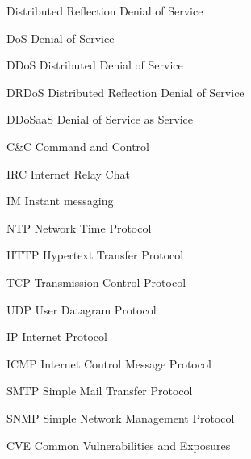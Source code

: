 \begin{seznamzkratek}{Distributed Reflection Denial of Service}

		{DoS}
		{Denial of Service}

		{DDoS}
		{Distributed Denial of Service}

		{DRDoS}
		{Distributed Reflection Denial of Service}

		{DDoSaaS}
		{Denial of Service as Service}

		{C\&C} %
		{Command and Control}

		{IRC}
		{Internet Relay Chat}

		{IM}
		{Instant messaging}

		{NTP}
		{Network Time Protocol}

		{HTTP}
		{Hypertext Transfer Protocol}

		{TCP}
		{Transmission Control Protocol}

		{UDP}
		{User Datagram Protocol}

		{IP}
		{Internet Protocol}

		{ICMP}
		{Internet Control Message Protocol}

		{SMTP}
		{Simple Mail Transfer Protocol}
		
		{SNMP}
		{Simple Network Management Protocol}
	
		{CVE}
		{Common Vulnerabilities and Exposures}
\end{seznamzkratek}
